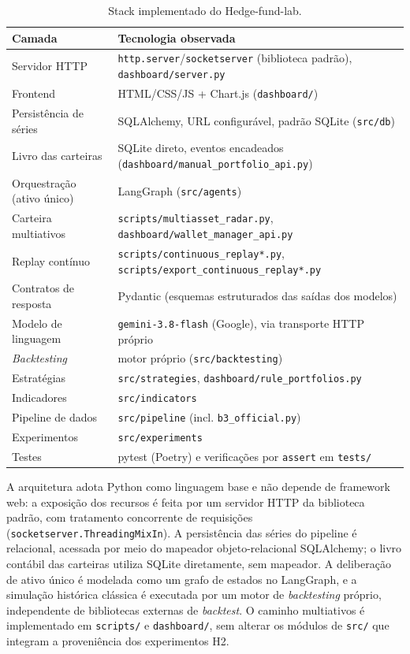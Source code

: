 \documentclass{eic-bcc-tcc}
\begin{document}
\begin{table}[!ht]
\centering
\caption{Stack implementado do Hedge-fund-lab.}
\label{tab:stack}
\small
\begin{tabular}{>{\raggedright\arraybackslash}p{3.8cm} >{\raggedright\arraybackslash}p{11.4cm}}
\toprule
\textbf{Camada} & \textbf{Tecnologia observada} \\
\midrule
Servidor HTTP & \texttt{http.server}/\texttt{socketserver} (biblioteca padrão), \texttt{dashboard/server.py} \\
Frontend & HTML/CSS/JS + Chart.js (\texttt{dashboard/}) \\
Persistência de séries & SQLAlchemy, URL configurável, padrão SQLite (\texttt{src/db}) \\
Livro das carteiras & SQLite direto, eventos encadeados (\texttt{dashboard/manual\_portfolio\_api.py}) \\
Orquestração (ativo único) & LangGraph (\texttt{src/agents}) \\
Carteira multiativos & \texttt{scripts/multiasset\_radar.py}, \texttt{dashboard/wallet\_manager\_api.py} \\
Replay contínuo & \texttt{scripts/continuous\_replay*.py}, \texttt{scripts/export\_continuous\_replay*.py} \\
Contratos de resposta & Pydantic (esquemas estruturados das saídas dos modelos) \\
Modelo de linguagem & \texttt{gemini-3.8-flash} (Google), via transporte HTTP próprio \\
\textit{Backtesting} & motor próprio (\texttt{src/backtesting}) \\
Estratégias & \texttt{src/strategies}, \texttt{dashboard/rule\_portfolios.py} \\
Indicadores & \texttt{src/indicators} \\
Pipeline de dados & \texttt{src/pipeline} (incl. \texttt{b3\_official.py}) \\
Experimentos & \texttt{src/experiments} \\
Testes & pytest (Poetry) e verificações por \texttt{assert} em \texttt{tests/} \\
\bottomrule
\end{tabular}
\end{table}

A arquitetura adota Python como linguagem base e não depende de framework web: a exposição dos recursos é feita por um servidor HTTP da biblioteca padrão, com tratamento concorrente de requisições (\texttt{socketserver.ThreadingMixIn}). A persistência das séries do pipeline é relacional, acessada por meio do mapeador objeto-relacional SQLAlchemy; o livro contábil das carteiras utiliza SQLite diretamente, sem mapeador. A deliberação de ativo único é modelada como um grafo de estados no LangGraph, e a simulação histórica clássica é executada por um motor de \textit{backtesting} próprio, independente de bibliotecas externas de \textit{backtest}. O caminho multiativos é implementado em \texttt{scripts/} e \texttt{dashboard/}, sem alterar os módulos de \texttt{src/} que integram a proveniência dos experimentos H2.
\end{document}
